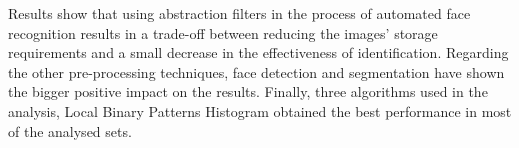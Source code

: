 Results show that using abstraction filters in the process of automated face recognition results in a trade-off between reducing the images' storage requirements and a small decrease in the effectiveness of identification. Regarding the other pre-processing techniques, face detection and segmentation have shown the bigger positive impact on the results. Finally, three algorithms used in the analysis, Local Binary Patterns Histogram obtained the best performance in most of the analysed sets. 